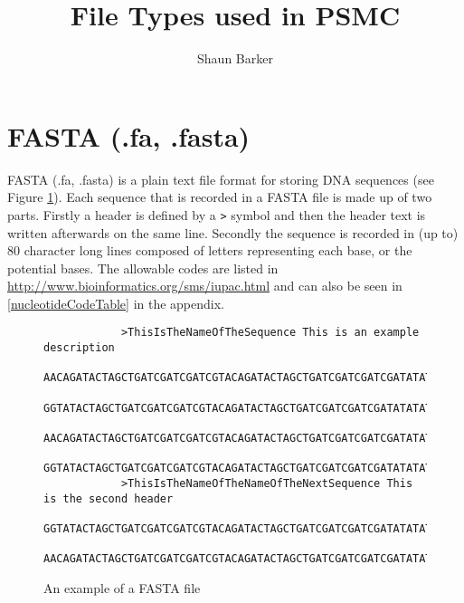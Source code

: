 \documentclass[a4]{article}
\title{File Types used in PSMC}
\author{Shaun Barker}
\begin{document}
\maketitle

\section{FASTA (.fa, .fasta)}
	FASTA (.fa, .fasta) is a plain text file format for storing DNA sequences (see Figure \ref{fasta}). Each sequence that is recorded in a FASTA file is made up of two parts. Firstly a header is defined by a \verb|>| symbol and then the header text is written afterwards on the same line. Secondly the sequence is recorded in (up to) 80 character long lines composed of letters representing each base, or the potential bases. The allowable codes are listed in \url{http://www.bioinformatics.org/sms/iupac.html} and can also be seen in \ref{nucleotideCodeTable} in the appendix.
	\begin{figure}[h]
		\begin{lstlisting}
			>ThisIsTheNameOfTheSequence This is an example description
			AACAGATACTAGCTGATCGATCGATCGTACAGATACTAGCTGATCGATCGATCGATATATATATGCCGCGATACGTACGT
			GGTATACTAGCTGATCGATCGATCGTACAGATACTAGCTGATCGATCGATCGATATATATATGCCGCGATACGTACGTAA
			AACAGATACTAGCTGATCGATCGATCGTACAGATACTAGCTGATCGATCGATCGATATATATATGCCGCGATACGTACGT
			GGTATACTAGCTGATCGATCGATCGTACAGATACTAGCTGATCGATCGATCGATATATATATGCCGCGATACGTACGTAA
			>ThisIsTheNameOfTheNameOfTheNextSequence This is the second header
			GGTATACTAGCTGATCGATCGATCGTACAGATACTAGCTGATCGATCGATCGATATATATATGCCGCGATACGTACGTAA
			AACAGATACTAGCTGATCGATCGATCGTACAGATACTAGCTGATCGATCGATCGATATATATATGCCGCGATACGTACGT
		\end{lstlisting}
		\caption{An example of a FASTA file}\label{fasta}
	\end{figure}
\end{document}
